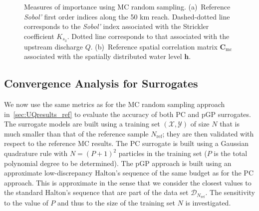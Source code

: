 \begin{figure}[!ht]               
\centering
{} 
\caption{Measures of importance using MC random sampling. (a)~Reference \emph{Sobol'} first order indices along the 50 km reach. Dashed-dotted line corresponds to the \emph{Sobol'} index associated with the Strickler coefficient $K_{s_3}$. Dotted line corresponds to that associated with the upstream discharge $Q$. (b)~Reference spatial correlation matrix $\mathbf{C}_{\text{mc}}$ associated with the spatially distributed water level $\mathbf{h}$.}
\label{fig:monte-carlo_sobol_corr}
\end{figure}

\subsection{Convergence Analysis for Surrogates}

We now use the same metrics as for the MC random sampling approach in~\cref{sec:UQresults_ref} to evaluate the accuracy of both PC and pGP surrogates. The surrogate models are built using a training set $(\mathcal{X}, \mathcal{Y})$ of size $N$ that is much smaller than that of the reference sample $N_{\text{ref}}$; they are then validated with respect to the reference MC results. The PC surrogate is built using a Gaussian quadrature rule with $N = (P+1)^2$ particles in the training set ($P$ is the total polynomial degree to be determined). The pGP approach is built using an approximate low-discrepancy Halton's sequence of the same budget as for the PC approach. This is approximate in the sense that we consider the closest values to the standard Halton's sequence that are part of the data set $\mathcal{D}_{N_{\text{ref}}}$. The sensitivity to the value of $P$ and thus to the size of the training set $N$ is investigated.

